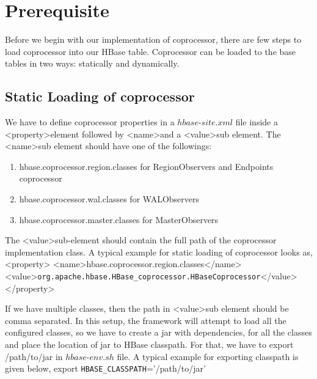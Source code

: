\documentclass[11pt,a4paper,bibtotoc,idxtotoc,headsepline,footsepline,footexclude,BCOR12mm,DIV13]{scrbook}
\begin{document}
\section{Prerequisite}
Before we begin with our implementation of coprocessor, there are few steps to load coprocessor into our HBase table. Coprocessor can be loaded to the base tables in two ways: statically and dynamically\cite{loading:coprocessors}. 

\subsection{Static Loading of coprocessor}
We have to define coprocessor properties in a $hbase$-$site.xml$ file inside a \textless property\textgreater \space element followed by \textless name\textgreater \space and a \textless value\textgreater \space sub element. The \textless name\textgreater \space sub element should have one of the followings\cite{hbase:site}:

\begin{enumerate}
	\item hbase.coprocessor.region.classes for RegionObservers and Endpoints coprocessor
	\item hbase.coprocessor.wal.classes for WALObservers
	\item hbase.coprocessor.master.classes for MasterObservers
	
\end{enumerate}

The \textless value\textgreater \space sub-element should contain the full path of the coprocessor implementation class. A typical example for static loading of coprocessor looks as,\newline \newline \textless property\textgreater \newline
\textless name\textgreater hbase.coprocessor.region.classes\textless /name\textgreater \newline
\textless value\textgreater \texttt{org.apache.hbase.HBase\_coprocessor.HBaseCoprocessor}\textless /value\textgreater \newline
\textless /property\textgreater \newline

 If we have multiple classes, then the path in \textless value\textgreater \space sub element should be comma separated. In this setup, the framework will attempt to load all the configured classes, so we have to create a jar with dependencies, for all the classes and place the location of jar to HBase classpath. For that, we have to export /path/to/jar in $hbase$-$env.sh$ file. A typical example for exporting classpath is given below, \newline \newline
 export \texttt{HBASE\_CLASSPATH}='/path/to/jar' \newline
 
\end{document}
